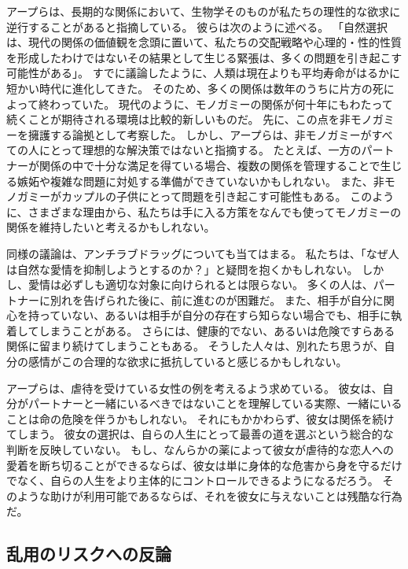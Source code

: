 \documentclass[paper=a4,book,openany]{jlreq} \usepackage{mystyle}
\begin{document}
アープらは、長期的な関係において、生物学そのものが私たちの理性的な欲求に逆行することがあると指摘している。
彼らは次のように述べる。
「自然選択は、現代の関係の価値観を念頭に置いて、私たちの交配戦略や心理的・性的性質を形成したわけではない{\DDASH}その結果として生じる緊張は、多くの問題を引き起こす可能性がある」\citep[p.567]{brian13:_natur_selec_child_ethic_marriag_divor}。
すでに議論したように、人類は現在よりも平均寿命がはるかに短かい時代に進化してきた。
そのため、多くの関係は数年のうちに片方の死によって終わっていた。
現代のように、モノガミーの関係が何十年にもわたって続くことが期待される環境は比較的新しいものだ。
先に、この点を非モノガミーを擁護する論拠として考察した。
しかし、アープらは、非モノガミーがすべての人にとって理想的な解決策ではないと指摘する。
たとえば、一方のパートナーが関係の中で十分な満足を得ている場合、複数の関係を管理することで生じる嫉妬や複雑な問題に対処する準備ができていないかもしれない。
また、非モノガミーがカップルの子供にとって問題を引き起こす可能性もある\citep[p.48]{earp20:_love_drugs}。
このように、さまざまな理由から、私たちは手に入る方策をなんでも使ってモノガミーの関係を維持したいと考えるかもしれない。

同様の議論は、アンチラブドラッグについても当てはまる。
私たちは、「なぜ人は自然な愛情を抑制しようとするのか？」と疑問を抱くかもしれない。
しかし、愛情は必ずしも適切な対象に向けられるとは限らない。
多くの人は、パートナーに別れを告げられた後に、前に進むのが困難だ。
また、相手が自分に関心を持っていない、あるいは相手が自分の存在すら知らない場合でも、相手に執着してしまうことがある。
さらには、健康的でない、あるいは危険ですらある関係に留まり続けてしまうこともある。
そうした人々は、別れたち思うが、自分の感情がこの合理的な欲求に抵抗していると感じるかもしれない。

アープらは、虐待を受けている女性の例を考えるよう求めている。
彼女は、自分がパートナーと一緒にいるべきではないことを理解している{\DDASH}実際、一緒にいることは命の危険を伴うかもしれない。
それにもかかわらず、彼女は関係を続けてしまう。
彼女の選択は、自らの人生にとって最善の道を選ぶという総合的な判断を反映していない。
もし、なんらかの薬によって彼女が虐待的な恋人への愛着を断ち切ることができるならば、彼女は単に身体的な危害から身を守るだけでなく、自らの人生をより主体的にコントロールできるようになるだろう。
そのような助けが利用可能であるならば、それを彼女に与えないことは残酷な行為だ。

\subsection{乱用のリスクへの反論}
\end{document}
